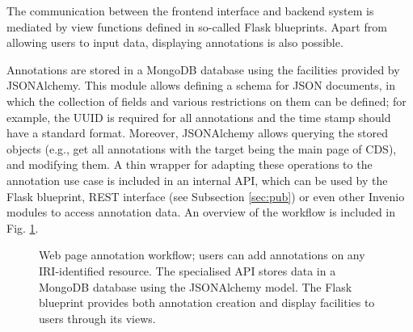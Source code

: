 The communication between the frontend interface and backend system is mediated
by view functions defined in so-called Flask blueprints. Apart from allowing
users to input data, displaying annotations is also possible.

Annotations are stored in a MongoDB database using the facilities provided by
JSONAlchemy. This module allows defining a schema for JSON documents, in which
the collection of fields and various restrictions on them can be defined; for
example, the UUID is required for all annotations and the time stamp should
have a standard format. Moreover, JSONAlchemy allows querying the stored
objects (e.g., get all annotations with the target being the main page of CDS),
and modifying them. A thin wrapper for adapting these operations to the
annotation use case is included in an internal API, which can be used by the
Flask blueprint, REST interface (see Subsection \ref{sec:pub}) or even other
Invenio modules to access annotation data. An overview of the workflow is
included in Fig. \ref{fig:baseanno}.

\begin{figure}[!ht]
  \centering
  \caption[Web page annotation workflow]
          {Web page annotation workflow; users can add annotations on any
           IRI-identified resource. The specialised API stores data in a
           MongoDB database using the JSONAlchemy model. The Flask blueprint
           provides both annotation creation and display facilities to users
           through its views.}
  \label{fig:baseanno}
\end{figure}
